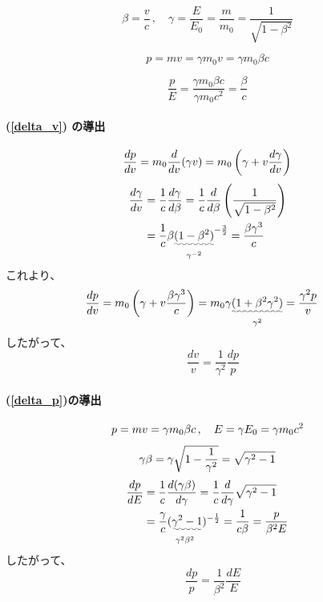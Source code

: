 \documentclass[10pt,a4paper]{ltjsarticle}
\begin{document}
\begin{equation}
    \beta = \frac{v}{c}\,,\quad \gamma = \frac{E}{E_0}=\frac{m}{m_0}=\frac{1}{\sqrt{1-\beta^2}}
\end{equation}

\begin{equation}
    p = mv = \gamma m_0 v = \gamma m_0 \beta c
\end{equation}

\begin{equation}
    \frac{p}{E} = \frac{\gamma m_0 \beta c}{\gamma m_0 c^2} = \frac{\beta}{c}
\end{equation}

\paragraph{(\ref{delta_v}) の導出}

\begin{equation}
  \frac{dp}{dv} = m_0\frac{d}{dv}(\gamma v)
  = m_0 \left(\gamma + v \frac{d\gamma}{dv}\right) \notag
\end{equation}
%
\begin{align}
  \frac{d\gamma}{dv} & = \frac{1}{c}\frac{d\gamma}{d\beta}= \frac{1}{c}\frac{d}{d\beta}\left(\frac{1}{\sqrt{1-\beta^2}}\right) \notag \\
  & = \frac{1}{c} \beta \underset{\gamma^{-2}}{\uwave{(1-\beta^2)}}^{-\frac{3}{2}} = \frac{\beta \gamma^3}{c} \notag
\end{align}
%
これより、
\begin{align}
  \frac{dp}{dv} & = m_0 \left(\gamma + v \frac{\beta \gamma^3}{c}\right)
  = m_0 \gamma \underset{\gamma^2}{\uwave{(1 + \beta^2 \gamma^2)}}
  = \frac{\gamma^2 p}{v} \notag
\end{align}
%
したがって、
%
\begin{equation}
  \quad \frac{dv}{v} = \frac{1}{\gamma^2}\frac{dp}{p}
  \label{dv_dp}
\end{equation}
%
\paragraph{(\ref{delta_p})の導出}
%
\begin{align}
  p = mv = \gamma m_0 \beta c\,  , \quad E = \gamma E_0 = \gamma m_0 c^2 \notag
\end{align}
%
\begin{equation}
  \gamma \beta = \gamma \sqrt{1-\frac{1}{\gamma^2}} \notag = \sqrt{\gamma^2 -1} \notag
\end{equation}
%
\begin{align}
  \frac{dp}{dE} & = \frac{1}{c}\frac{d(\gamma \beta)}{d\gamma} = \frac{1}{c}\frac{d}{d\gamma}\sqrt{\gamma^2 -1} \notag \\
  & = \frac{\gamma}{c} \underset{\gamma^2\beta^2}{(\uwave{\gamma^2 -1}})^{-\frac{1}{2}} = \frac{1}{c\beta}
  = \frac{p}{\beta^2 E}\notag
\end{align}
%
したがって、
%
\begin{equation}
  \quad \frac{dp}{p} = \frac{1}{\beta^2}\frac{dE}{E}
  \label{dp_de}
\end{equation}
\end{document}

